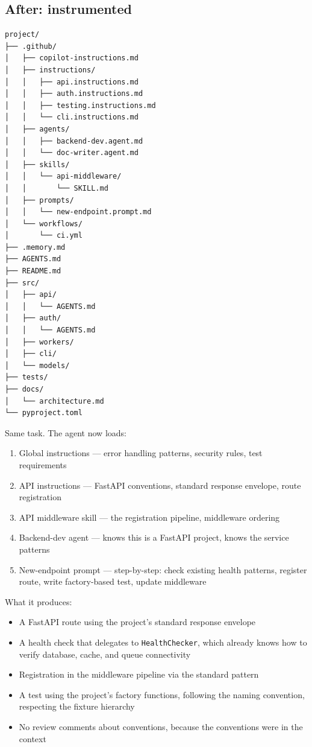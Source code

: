 \documentclass[
  a4paper,
  DIV=11,
  numbers=noendperiod]{scrreprt}
\providecommand{\tightlist}{%
  \setlength{\itemsep}{0pt}\setlength{\parskip}{0pt}}
\begin{document}
\subsection{After: instrumented}\label{after-instrumented}

\begin{verbatim}
project/
├── .github/
│   ├── copilot-instructions.md
│   ├── instructions/
│   │   ├── api.instructions.md
│   │   ├── auth.instructions.md
│   │   ├── testing.instructions.md
│   │   └── cli.instructions.md
│   ├── agents/
│   │   ├── backend-dev.agent.md
│   │   └── doc-writer.agent.md
│   ├── skills/
│   │   └── api-middleware/
│   │       └── SKILL.md
│   ├── prompts/
│   │   └── new-endpoint.prompt.md
│   └── workflows/
│       └── ci.yml
├── .memory.md
├── AGENTS.md
├── README.md
├── src/
│   ├── api/
│   │   └── AGENTS.md
│   ├── auth/
│   │   └── AGENTS.md
│   ├── workers/
│   ├── cli/
│   └── models/
├── tests/
├── docs/
│   └── architecture.md
└── pyproject.toml
\end{verbatim}

Same task. The agent now loads:

\begin{enumerate}
\def\labelenumi{\arabic{enumi}.}
\tightlist
\item
  Global instructions --- error handling patterns, security rules, test
  requirements
\item
  API instructions --- FastAPI conventions, standard response envelope,
  route registration
\item
  API middleware skill --- the registration pipeline, middleware
  ordering
\item
  Backend-dev agent --- knows this is a FastAPI project, knows the
  service patterns
\item
  New-endpoint prompt --- step-by-step: check existing health patterns,
  register route, write factory-based test, update middleware
\end{enumerate}

What it produces:

\begin{itemize}
\tightlist
\item
  A FastAPI route using the project's standard response envelope
\item
  A health check that delegates to \texttt{HealthChecker}, which already
  knows how to verify database, cache, and queue connectivity
\item
  Registration in the middleware pipeline via the standard pattern
\item
  A test using the project's factory functions, following the naming
  convention, respecting the fixture hierarchy
\item
  No review comments about conventions, because the conventions were in
  the context
\end{itemize}
\end{document}
